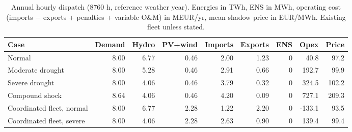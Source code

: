 \begin{table}[htbp]
\centering
\footnotesize
\caption{Annual hourly dispatch (8760 h, reference weather year). Energies in TWh, ENS in MWh, operating cost (imports $-$ exports + penalties + variable O\&M) in MEUR/yr, mean shadow price in EUR/MWh. Existing fleet unless stated.}
\label{tab:annual}
\begin{adjustbox}{max width=\linewidth}
\begin{tabular}{lrrrrrrrr}
\toprule
Case & Demand & Hydro & PV+wind & Imports & Exports & ENS & Opex & Price \\
\midrule
Normal & 8.00 & 6.77 & 0.46 & 2.00 & 1.23 & 0 & 40.8 & 97.2 \\
Moderate drought & 8.00 & 5.28 & 0.46 & 2.91 & 0.66 & 0 & 192.7 & 99.9 \\
Severe drought & 8.00 & 4.06 & 0.46 & 3.79 & 0.32 & 0 & 324.5 & 102.2 \\
Compound shock & 8.64 & 4.06 & 0.46 & 4.20 & 0.09 & 0 & 727.1 & 209.3 \\
Coordinated fleet, normal & 8.00 & 6.77 & 2.28 & 1.22 & 2.20 & 0 & -133.1 & 93.5 \\
Coordinated fleet, severe & 8.00 & 4.06 & 2.28 & 2.63 & 0.90 & 0 & 139.4 & 99.4 \\
\bottomrule
\end{tabular}
\end{adjustbox}
\end{table}
